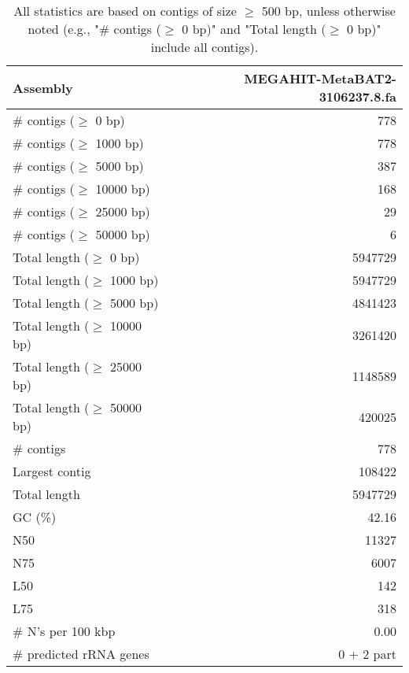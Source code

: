\documentclass[12pt,a4paper]{article}
\begin{document}
\begin{table}[ht]
\begin{center}
\caption{All statistics are based on contigs of size $\geq$ 500 bp, unless otherwise noted (e.g., "\# contigs ($\geq$ 0 bp)" and "Total length ($\geq$ 0 bp)" include all contigs).}
\begin{tabular}{|l*{1}{|r}|}
\hline
Assembly & MEGAHIT-MetaBAT2-3106237.8.fa \\ \hline
\# contigs ($\geq$ 0 bp) & 778 \\ \hline
\# contigs ($\geq$ 1000 bp) & 778 \\ \hline
\# contigs ($\geq$ 5000 bp) & 387 \\ \hline
\# contigs ($\geq$ 10000 bp) & 168 \\ \hline
\# contigs ($\geq$ 25000 bp) & 29 \\ \hline
\# contigs ($\geq$ 50000 bp) & 6 \\ \hline
Total length ($\geq$ 0 bp) & 5947729 \\ \hline
Total length ($\geq$ 1000 bp) & 5947729 \\ \hline
Total length ($\geq$ 5000 bp) & 4841423 \\ \hline
Total length ($\geq$ 10000 bp) & 3261420 \\ \hline
Total length ($\geq$ 25000 bp) & 1148589 \\ \hline
Total length ($\geq$ 50000 bp) & 420025 \\ \hline
\# contigs & 778 \\ \hline
Largest contig & 108422 \\ \hline
Total length & 5947729 \\ \hline
GC (\%) & 42.16 \\ \hline
N50 & 11327 \\ \hline
N75 & 6007 \\ \hline
L50 & 142 \\ \hline
L75 & 318 \\ \hline
\# N's per 100 kbp & 0.00 \\ \hline
\# predicted rRNA genes & 0 + 2 part \\ \hline
\end{tabular}
\end{center}
\end{table}
\end{document}

